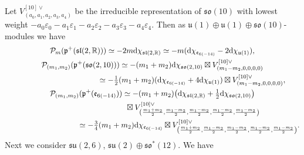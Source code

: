 \documentclass[pdftex]{sigma}
\numberwithin{equation}{section}
\newcommand{\BR}{\mathbb{R}}
\newcommand{\fp}{\mathfrak{p}}
\newcommand{\cP}{\mathcal{P}}
\newcommand{\ve}{\varepsilon}
\begin{document}
Let $V_{(a_0,a_1,a_2,a_3,a_4)}^{[10]\vee}$ be the irreducible representation of $\mathfrak{so}(10)$ with lowest weight
$-a_0\ve_0-a_1\ve_1-a_2\ve_2-a_3\ve_3-a_4\ve_4$. Then as $\mathfrak{u}(1)\oplus\mathfrak{u}(1)\oplus\mathfrak{so}(10)$-modules we have
\begin{gather*}
\cP_m(\fp^+(\mathfrak{sl}(2,\BR))) \simeq -2m{\rm d}\chi_{\mathfrak{sl}(2,\BR)}\simeq -m({\rm d}\chi_{\mathfrak{e}_{6(-14)}}-2{\rm d}\chi_{\mathfrak{u}(1)}),\\
\cP_{(m_1,m_2)}(\fp^+(\mathfrak{so}(2,10))) \simeq -(m_1+m_2){\rm d}\chi_{\mathfrak{so}(2,10)}\boxtimes V_{(m_1-m_2,0,0,0,0)}^{[10]\vee}\\
\hphantom{\cP_{(m_1,m_2)}(\fp^+(\mathfrak{so}(2,10)))}{} \simeq -\tfrac{1}{2} (m_1+m_2)({\rm d}\chi_{\mathfrak{e}_{6(-14)}}+4{\rm d}\chi_{\mathfrak{u}(1)})\boxtimes V_{(m_1-m_2,0,0,0,0)}^{[10]\vee},\\
\cP_{(m_1,m_2)}(\fp^+(\mathfrak{e}_{6(-14)})) \simeq -(m_1+m_2)\big({\rm d}\chi_{\mathfrak{sl}(2,\BR)}+\tfrac12 {{\rm d}\chi_{\mathfrak{so}(2,10)}}\big) \\
 \hphantom{\cP_{(m_1,m_2)}(\fp^+(\mathfrak{e}_{6(-14)})) \simeq}{} \boxtimes V_{\left(\frac{m_1+m_2}{2},\frac{m_1-m_2}{2},\frac{m_1-m_2}{2},\frac{m_1-m_2}{2},\frac{m_1-m_2}{2}\right)}^{[10]\vee}\\
 \hphantom{\cP_{(m_1,m_2)}(\fp^+(\mathfrak{e}_{6(-14)}))}{} \simeq -\tfrac{3}{4}(m_1+m_2){\rm d}\chi_{\mathfrak{e}_{6(-14)}}
\boxtimes V_{\left(\frac{m_1+m_2}{2},\frac{m_1-m_2}{2},\frac{m_1-m_2}{2},\frac{m_1-m_2}{2},\frac{m_1-m_2}{2}\right)}^{[10]\vee}.
\end{gather*}
Next we consider $\mathfrak{su}(2,6)$, $\mathfrak{su}(2)\oplus\mathfrak{so}^*(12)$. We have
\end{document}
